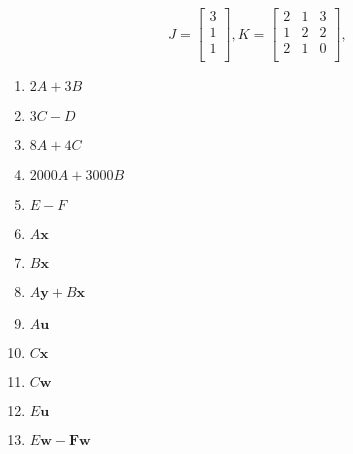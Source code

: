 \documentclass[11pt,a4paper,titlepage,oneside,openany]{article}
\numberwithin{equation}{section}
\numberwithin{algorithm}{section}
\numberwithin{figure}{section}
\numberwithin{table}{section}
\renewcommand{\vec}[1]{\mathbf{#1}}
\begin{document}
\begin{enumerate}
\begin{equation*}
  \end{equation*}
    \begin{equation*}
J=\left[ \begin{array}{c}
3\\
1\\
1\\ \end{array}\right],
K=\left[ \begin{array}{ccc}
2 & 1 & 3\\1 & 2 & 2\\2 & 1 & 0\\\end{array}\right], 
  \end{equation*}
  \begin{multicols}{3}
    \begin{enumerate}
    \item $2A+3B$
    \item $3C-D$
    \item $8A+4C$
    \item $2000A+3000B$
    \item $E-F$
    \item $A\vec{x}$
    \item $B\vec{x}$
    \item $A\vec{y}+B\vec{x}$
    \item $A\vec{u}$
    \item $C\vec{x}$
    \item $C\vec{w}$
    \item $E\vec{u}$
    \item $E\vec{w}-\vec{F}\vec{w}$

    \end{enumerate}
  \end{multicols}

\end{enumerate}
\end{document}
